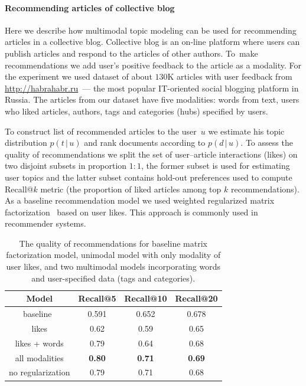 \documentclass{sig-alternate-2013}
\newcommand{\cond}{\mspace{3mu}{|}\mspace{3mu}}
\begin{document}
\paragraph{Recommending articles of collective blog}

Here we describe how multimodal topic modeling can be used for recommending articles in a collective blog.
Collective blog is an on-line platform where users can publish articles and respond to the articles of other authors.
To~make recommendations we add user's positive feedback to the article as a  modality.
For the experiment we used dataset of about $130$K articles with user feedback from \url{http://habrahabr.ru}~---
the most popular IT-oriented social blogging platform in Russia.
The articles from our dataset have five modalities:
words from text, users who liked articles, authors, tags and categories (hubs) specified by users.

To construct list of recommended articles to the user~$u$
we estimate his topic distribution $p(t\cond u)$ and rank documents according to $p(d\cond u)$.
To assess the quality of recommendations
we split the set of user--article interactions (likes) on two disjoint subsets in proportion $1:1$,
the former subset is used for estimating user topics and
the latter subset contains hold-out preferences used to compute Recall@$k$ metric
(the proportion of liked articles among top $k$ recommendations).
As a baseline recommendation model we used weighted regularized matrix factorization~\cite{hu08ials} based on user likes.
This approach is commonly used in recommender systems.

\begin{table}[t]
	\caption{
    The quality of recommendations for baseline matrix factorization model,
    unimodal model with only modality of user likes, and
    two multimodal models incorporating words and user-specified data (tags and categories).
	}
	\label{tab:habrahabr_recommendation_comparison}
    \centering\tabcolsep=4.3pt
	\begin{tabular}[t]{c|c|c|c}
	\hline
	Model & Recall@5 & Recall@10 & Recall@20 \\
	\hline
	baseline~\cite{hu08ials} & 0.591 & 0.652 & 0.678 \\
	likes & 0.62 & 0.59 & 0.65 \\
	likes + words & 0.79 & 0.64 & 0.68 \\
	all modalities & \bfseries{0.80} & \bfseries{0.71} & \bfseries{0.69} \\
	no regularization & 0.79 & 0.71 & 0.68 \\
	\hline
	\end{tabular}
\end{table}
\end{document}
